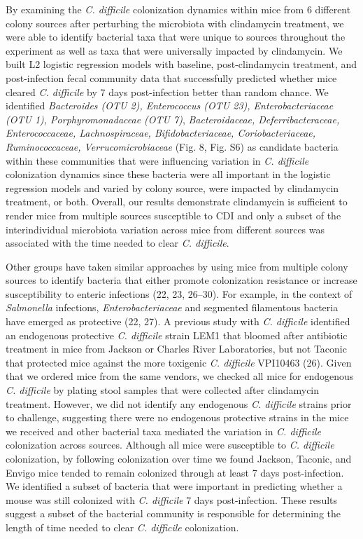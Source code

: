 \documentclass[11pt,]{article}
\begin{document}
By examining the \emph{C. difficile} colonization dynamics within mice
from 6 different colony sources after perturbing the microbiota with
clindamycin treatment, we were able to identify bacterial taxa that were
unique to sources throughout the experiment as well as taxa that were
universally impacted by clindamycin. We built L2 logistic regression
models with baseline, post-clindamycin treatment, and post-infection
fecal community data that successfully predicted whether mice cleared
\emph{C. difficile} by 7 days post-infection better than random chance.
We identified \emph{Bacteroides (OTU 2), Enterococcus (OTU 23),
Enterobacteriaceae (OTU 1), Porphyromonadaceae (OTU 7)},
\emph{Bacteroidaceae, Deferribacteraceae, Enterococcaceae,
Lachnospiraceae, Bifidobacteriaceae, Coriobacteriaceae, Ruminococcaceae,
Verrucomicrobiaceae} (Fig. 8, Fig. S6) as candidate bacteria within
these communities that were influencing variation in \emph{C. difficile}
colonization dynamics since these bacteria were all important in the
logistic regression models and varied by colony source, were impacted by
clindamycin treatment, or both. Overall, our results demonstrate
clindamycin is sufficient to render mice from multiple sources
susceptible to CDI and only a subset of the interindividual microbiota
variation across mice from different sources was associated with the
time needed to clear \emph{C. difficile}.

Other groups have taken similar approaches by using mice from multiple
colony sources to identify bacteria that either promote colonization
resistance or increase susceptibility to enteric infections (22, 23,
26--30). For example, in the context of \emph{Salmonella} infections,
\emph{Enterobacteriaceae} and segmented filamentous bacteria have
emerged as protective (22, 27). A previous study with \emph{C.
difficile} identified an endogenous protective \emph{C. difficile}
strain LEM1 that bloomed after antibiotic treatment in mice from Jackson
or Charles River Laboratories, but not Taconic that protected mice
against the more toxigenic \emph{C. difficile} VPI10463 (26). Given that
we ordered mice from the same vendors, we checked all mice for
endogenous \emph{C. difficile} by plating stool samples that were
collected after clindamycin treatment. However, we did not identify any
endogenous \emph{C. difficile} strains prior to challenge, suggesting
there were no endogenous protective strains in the mice we received and
other bacterial taxa mediated the variation in \emph{C. difficile}
colonization across sources. Although all mice were susceptible to
\emph{C. difficile} colonization, by following colonization over time we
found Jackson, Taconic, and Envigo mice tended to remain colonized
through at least 7 days post-infection. We identified a subset of
bacteria that were important in predicting whether a mouse was still
colonized with \emph{C. difficile} 7 days post-infection. These results
suggest a subset of the bacterial community is responsible for
determining the length of time needed to clear \emph{C. difficile}
colonization.
\end{document}
